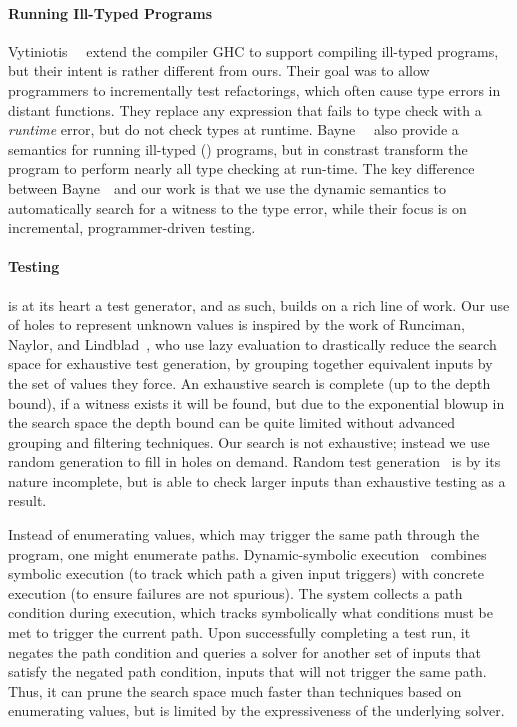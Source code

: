 \paragraph{Running Ill-Typed Programs}
\label{sec:nanomaly:running-ill-typed}
Vytiniotis~\etal~\citealt{Vytiniotis2012-gh} extend the \haskell
compiler GHC to support compiling ill-typed programs, but their intent
is rather different from ours. Their goal was to allow programmers to
incrementally test refactorings, which often cause type errors in
distant functions. They replace any expression that fails to type
check with a \emph{runtime} error, but do not check types
at runtime.
%
Bayne~\etal~\citealt{Bayne2011-cn} also provide a semantics for running
ill-typed (\java) programs, but in constrast transform the program to
perform nearly all type checking at run-time. The key difference between
Bayne~\etal\ and our work is that we use the dynamic semantics to
automatically search for a witness to the type error, while their focus
is on incremental, programmer-driven testing.

\paragraph{Testing}\label{sec:nanomaly:testing}
%
\nanomaly is at its heart a test generator, and as such,
builds on a rich line of work.
%
Our use of holes to represent unknown values is inspired by the work of
Runciman, Naylor, and Lindblad~\cite{Runciman2008-ka,Naylor2007-mi,Lindblad2007-oy},
%
who use lazy evaluation to drastically reduce the search space for
exhaustive test generation, by grouping together equivalent inputs by
the set of values they force. An exhaustive search is complete (up to
the depth bound), if a witness exists it will be found, but due to the
exponential blowup in the search space the depth bound can be quite
limited without advanced grouping and filtering techniques.
%
Our search is not exhaustive; instead we use random generation to fill
in holes on demand.
%
Random test generation~\cite{Claessen2000-lj,Csallner2004-bf,Pacheco2007-at}
%
is by its nature incomplete, but is able to check larger inputs than
exhaustive testing as a result.

Instead of enumerating values, which may trigger the same path through
the program, one might enumerate paths.
%
Dynamic-symbolic execution~\cite{Godefroid2005-am,Cadar2008-kg,Tillmann2008-qc}
%
combines symbolic execution (to track which path a given input triggers)
with concrete execution (to ensure failures are not spurious). The
system collects a path condition during execution, which tracks
symbolically what conditions must be met to trigger the current
path. Upon successfully completing a test run, it negates the path
condition and queries a solver for another set of inputs that satisfy
the negated path condition, \ie inputs that will not trigger the same
path. Thus, it can prune the search space much faster than techniques
based on enumerating values, but is limited by the expressiveness of the
underlying solver.

